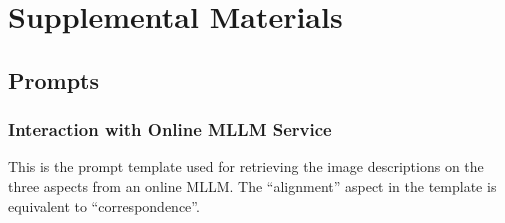 
\section{Supplemental Materials}

\subsection{Prompts}
\subsubsection{Interaction with Online MLLM Service}
This is the prompt template used for retrieving the image descriptions on the three aspects from an online MLLM. The ``alignment'' aspect in the template is equivalent to ``correspondence''. 
